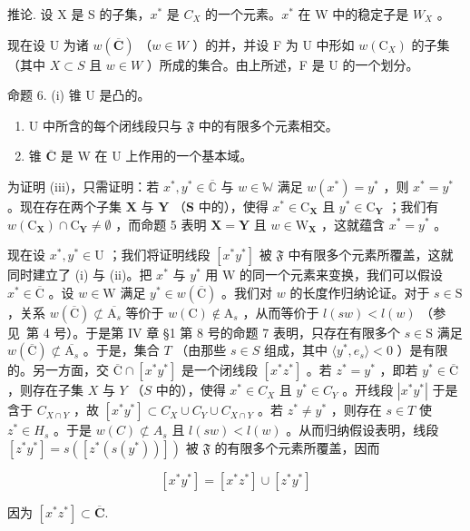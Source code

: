 推论. 设 X 是 S 的子集，\(x^{*}\) 是 \(C_{X}\) 的一个元素。\(x^{*}\) 在 W 中的稳定子是 \(W_{X}\) 。

现在设 U 为诸 \(w(\overline{\mathbf{C}})\) （\(w \in W\) ）的并，并设 F 为 U 中形如 \(w(\mathrm{C}_{X})\) 的子集（其中 \(X \subset S\) 且 \(w \in W\) ）所成的集合。由上所述，F 是 U 的一个划分。

命题 6. (i) 锥 U 是凸的。

\begin{enumerate}
\def\labelenumi{(\roman{enumi})}
\setcounter{enumi}{1}
\item
  U 中所含的每个闭线段只与 \(\mathfrak{F}\) 中的有限多个元素相交。
\item
  锥 \(\overline{\mathbf{C}}\) 是 W 在 U 上作用的一个基本域。
\end{enumerate}

为证明 (iii)，只需证明：若 \(x^{*}, y^{*} \in \overline{\mathbb{C}}\) 与 \(w \in \mathbb{W}\) 满足 \(w(x^{*}) = y^{*}\) ，则 \(x^{*} = y^{*}\) 。现在存在两个子集 \(\mathbf{X}\) 与 \(\mathbf{Y}\) （\(\mathbf{S}\) 中的），使得 \(x^{*} \in \mathrm{C}_{\mathbf{X}}\) 且 \(y^{*} \in \mathrm{C}_{\mathbf{Y}}\) ；我们有 \(w(\mathrm{C}_{\mathbf{X}}) \cap \mathrm{C}_{\mathbf{Y}} \neq \emptyset\) ，而命题 5 表明 \(\mathbf{X} = \mathbf{Y}\) 且 \(w \in \mathrm{W}_{\mathbf{X}}\) ，这就蕴含 \(x^{*} = y^{*}\) 。

现在设 \(x^{*}, y^{*} \in \mathrm{U}\) ；我们将证明线段 \([x^{*}y^{*}]\) 被 \(\mathfrak{F}\) 中有限多个元素所覆盖，这就同时建立了 (i) 与 (ii)。把 \(x^{*}\) 与 \(y^{*}\) 用 \(\mathrm{W}\) 的同一个元素来变换，我们可以假设 \(x^{*} \in \overline{\mathrm{C}}\) 。设 \(w \in \mathrm{W}\) 满足 \(y^{*} \in w(\overline{\mathrm{C}})\) 。我们对 \(w\) 的长度作归纳论证。对于 \(s \in \mathrm{S}\) ，关系 \(w(\overline{\mathrm{C}}) \not\subset \overline{\mathrm{A}_{s}}\) 等价于 \(w(\mathrm{C}) \notin \mathrm{A}_{s}\) ，从而等价于 \(l(sw) < l(w)\) （参见~第 4 号）。于是第 IV 章 §1 第 8 号的命题 7 表明，只存在有限多个 \(s \in \mathrm{S}\) 满足 \(w(\overline{\mathrm{C}}) \not\subset \overline{\mathrm{A}_{s}}\) 。于是，集合 \(T\) （由那些 \(s \in S\) 组成，其中 \(\langle y^{*}, e_{s} \rangle < 0\) ）是有限的。另一方面，交 \(\overline{\mathrm{C}} \cap [x^{*}y^{*}]\) 是一个闭线段 \([x^{*}z^{*}]\) 。若 \(z^{*} = y^{*}\) ，即若 \(y^{*} \in \overline{\mathrm{C}}\) ，则存在子集 \(X\) 与 \(Y\) （\(S\) 中的），使得 \(x^{*} \in C_{X}\) 且 \(y^{*} \in C_{Y}\) 。开线段 \(|x^{*}y^{*}|\) 于是含于 \(C_{X \cap Y}\) ，故 \([x^{*}y^{*}] \subset C_{X} \cup C_{Y} \cup C_{X \cap Y}\) 。若 \(z^{*} \neq y^{*}\) ，则存在 \(s \in T\) 使 \(z^{*} \in H_{s}\) 。于是 \(w(C) \not\subset A_{s}\) 且 \(l(sw) < l(w)\) 。从而归纳假设表明，线段 \([z^{*}y^{*}] = s([z^{*}(s(y^{*}))])\) 被 \(\mathfrak{F}\) 的有限多个元素所覆盖，因而

\[
\left[ x ^ {*} y ^ {*} \right] = \left[ x ^ {*} z ^ {*} \right] \cup \left[ z ^ {*} y ^ {*} \right]
\]

因为 \([x^{*}z^{*}]\subset \overline{\mathbf{C}}.\)

